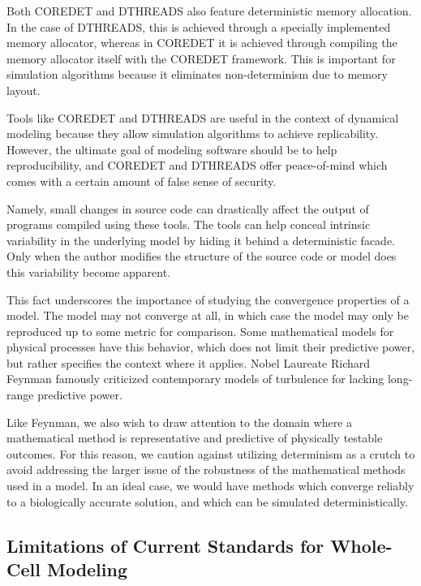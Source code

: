 \documentclass[journal,transmag,twoside]{IEEEtran}
\begin{document}
Both C{\small ORE}D{\small ET} and D{\small THREADS} also
feature deterministic memory allocation. In the case of D{\small THREADS},
this is achieved through a specially implemented memory allocator,
whereas in C{\small ORE}D{\small ET} it is achieved through compiling the
memory allocator itself with the C{\small ORE}D{\small ET} framework.
This is important for simulation algorithms because it eliminates non-determinism
due to memory layout.

Tools like C{\small ORE}D{\small ET} and D{\small THREADS} are useful in the context of
dynamical modeling because they allow simulation algorithms to achieve replicability.
However, the ultimate goal of modeling software should be to help reproducibility,
and C{\small ORE}D{\small ET} and D{\small THREADS} offer peace-of-mind which comes
with a certain amount of false sense of security.

Namely, small changes in source code can drastically affect the output of programs
compiled using these tools. The tools can help conceal intrinsic variability in the
underlying model by hiding it behind a deterministic facade.
Only when the author modifies the structure of the source code or model does this
variability become apparent.

This fact underscores the importance of studying the convergence properties of a model.
The model may not converge at all, in which case the model may only be reproduced up to
some metric for comparison. Some mathematical models for physical processes have this
behavior, which does not limit their predictive power, but rather specifies the context
where it applies.
Nobel Laureate Richard Feynman famously criticized contemporary models of turbulence
for lacking long-range predictive power.

Like Feynman, we also wish to draw attention to the domain where a mathematical method
is representative and predictive of physically testable outcomes.
For this reason, we caution against utilizing determinism as a crutch to avoid
addressing the larger issue of the robustness of the mathematical methods used in a model.
In an ideal case, we would have methods which converge reliably to a biologically accurate
solution, and which can be simulated deterministically.

\subsection{Limitations of Current Standards for Whole-Cell Modeling}
\end{document}
